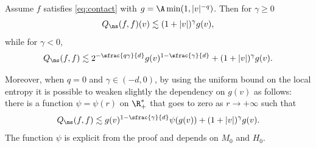 \skpt
\begin{prop}[Estimate of $Q_{\ns}(f,f)$] \label{prop:Q2} Assume $f$
satisfies \eqref{eq:contact} with $g = \A \min(1,|v|^{-q})$. Then
for $\gamma \ge 0$
\[ Q_{\ns}(f,f)(v) \lesssim (1+|v|)^{\gamma} g(v), \]
while for $\gamma <0$,
\[
Q_{\ns}(f,f) \lesssim 2^{-\sfrac{q\gamma}{d}} g(v)^{1-\sfrac{\gamma}{d}} +
(1+|v|)^\gamma g(v).
\]

Moreover, when $q=0$ and $\gamma\in (-d,0)$, by using the uniform bound
on the local entropy it is possible to weaken slightly the dependency
on $g(v)$ as follows: there is a function $\psi =\psi(r)$ on $\R_+^*$
that goes to zero as $r \to +\infty$ such that
\begin{equation}
\label{eq:Qnslog}
Q_{\ns}(f,f) \lesssim g(v)^{1-\sfrac{\gamma}{d}} \psi(g(v))
+ (1+|v|)^\gamma g(v).
\end{equation}
The function $\psi$ is explicit from the proof and depends on $M_0$
and $H_0$.
\end{prop}


